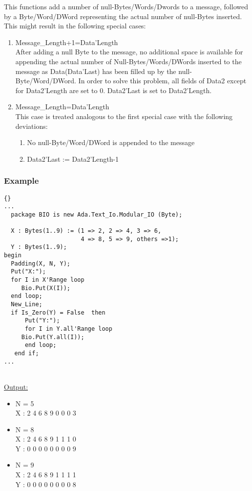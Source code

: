  This functions add a number of null-Bytes/Words/Dwords to a message,
 followed by a Byte/Word/DWord representing the actual number of null-Bytes
 inserted. This might result in the following special cases:
 \begin{enumerate}
 \item Message\_Length+1=Data'Length\\
   After adding a null Byte to the message, no additional space is available
   for appending the actual number of Null-Bytes/Words/DWords inserted to the message
   as Data(Data'Last) has been filled up by the null-Byte/Word/DWord.
   In order to solve this problem, all fields of Data2 except for Data2'Length are set to 0.
   Data2'Last is set to Data2'Length.
 \item Message\_Length=Data'Length\\
   This case is treated analogous to the first special case with the following deviations:
   \begin{enumerate}
   \item No null-Byte/Word/DWord is appended to the message
   \item Data2'Last := Data2'Length-1
   \end{enumerate}
 \end{enumerate}

\subsubsection{Example}
\begin{lstlisting}{}
... 
  package BIO is new Ada.Text_Io.Modular_IO (Byte);

  X : Bytes(1..9) := (1 => 2, 2 => 4, 3 => 6, 
                      4 => 8, 5 => 9, others =>1);
  Y : Bytes(1..9);
begin
  Padding(X, N, Y);
  Put("X:");
  for I in X'Range loop
     Bio.Put(X(I));
  end loop;
  New_Line;
  if Is_Zero(Y) = False  then
      Put("Y:");
      for I in Y.all'Range loop
	 Bio.Put(Y.all(I));
      end loop;
   end if;
...
\end{lstlisting}\ \\
\underline{Output:}\\
\begin{itemize}
\item N = 5\\
  X : 2   4   6  8  9   0   0   0   3
\item N = 8\\
  X : 2   4   6   8   9   1   1   1   0\\
  Y : 0   0   0   0   0   0   0   0   9
\item N = 9\\
  X : 2   4   6   8   9   1   1   1   1\\
  Y : 0   0   0   0   0   0   0   0   8
\end{itemize}




